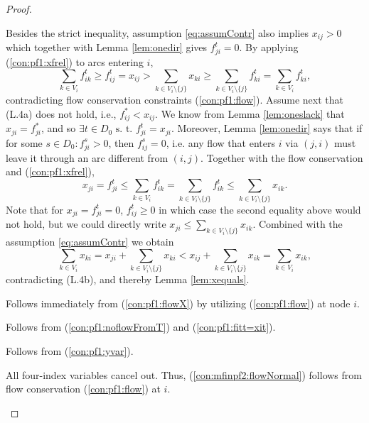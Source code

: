 \begin{proof}
\begin{itemize}[leftmargin=1cm]
Besides the strict inequality, assumption \ref{eq:assumContr} also implies $x_{ij}> 0$ which together with Lemma \ref{lem:onedir} gives $f^t_{ji}=0$. By applying (\ref{con:pf1:xfrel}) to arcs entering $i$,
$$\sum\limits_{k\in V_i}f^t_{ik} \geq f^t_{ij}=x_{ij}>\sum\limits_{k \in V_i\setminus\{j\}}x_{ki} \geq \sum\limits_{k \in V_i\setminus\{j\}}f^t_{ki}=\sum\limits_{k \in V_i}f^t_{ki},$$
contradicting flow conservation constraints (\ref{con:pf1:flow}).
Assume next that (L.4a) does not hold, i.e., $f^*_{ij}<x_{ij}$. We know from Lemma \ref{lem:oneslack} that $x_{ji}=f^*_{ji}$, and so $\exists t\in D_0 \text{ s. t. }f^t_{ji}=x_{ji}$. Moreover, Lemma \ref{lem:onedir} says that if for some $s\in D_0: f^s_{ji}>0$, then $f^s_{ij} = 0$, i.e. any flow that enters $i$ via $(j,i)$ must leave it through an arc different from $(i,j)$. Together with the flow conservation and (\ref{con:pf1:xfrel}),
$$
x_{ji}=f^t_{ji}\leq\sum_{k\in V_i}f^t_{ik}=\sum_{k\in V_i\setminus\{j\}}f^t_{ik}\leq\sum_{k\in V_i\setminus\{j\}}x_{ik}.
$$
Note that for $x_{ji}=f^t_{ji}=0$, $f^t_{ij}\geq 0$ in which case the second equality above would not hold, but we could directly write $x_{ji}\leq\sum_{k\in V_i\setminus\{j\}}x_{ik}$. Combined with the assumption \ref{eq:assumContr} we obtain
$$
\sum_{k\in V_i}x_{ki} = x_{ji} + \sum_{k\in V_i\setminus\{j\}}x_{ki}<x_{ij} + \sum_{k\in V_i\setminus\{j\}}x_{ik} = \sum_{k\in V_i}x_{ik},
$$
contradicting (L.4b), and thereby Lemma \ref{lem:xequals}.
\item[ (\ref{con:mfinpf2:extraCon}):] Follows immediately from (\ref{con:pf1:flowX}) by utilizing (\ref{con:pf1:flow}) at node $i$.
\item[ (\ref{con:mfinpf2:startInSource}):] Follows from (\ref{con:pf1:noflowFromT}) and (\ref{con:pf1:fitt=xit}).
\item[ (\ref{con:mfinpf2:yvar}):] Follows from (\ref{con:pf1:yvar}).
{\indentitem\item[ (\ref{con:mfinpf2:flowNormal})-(\ref{con:mfinpf2:flowDest}):] All four-index variables cancel out. Thus, (\ref{con:mfinpf2:flowNormal}) follows from flow conservation (\ref{con:pf1:flow}) at $i$.}
\item[ (\ref{con:mfinpf2:zbound}):] %

\end{itemize}
\end{proof}
